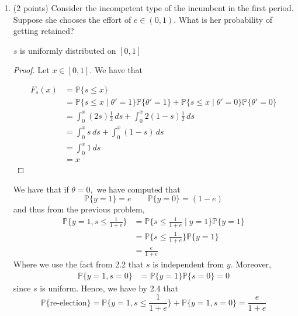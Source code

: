 \documentclass[11pt]{article}
\newcommand{\bbP}{\mathbb{P}}
\begin{document}
\begin{enumerate}
        \item (2 points) Consider the incompetent type of the incumbent in the first period. Suppose she chooses the effort of $e \in (0, 1)$. What is her probability of getting retained?
    \begin{solution}
\begin{lemma}
    $s$ is uniformly distributed on $[0,1]$
\end{lemma}
\begin{proof}
    Let $x \in [0,1].$ We have that

    \begin{align*}
        F_s(x) &= \bbP\{s \leq x\}\\
        &= \bbP\{s \leq x \mid \theta' = 1\}\bbP\{\theta' = 1\} + \bbP\{s \leq x \mid \theta' = 0 \}\bbP\{\theta' = 0\}\\
        &= \int_0^x (2s)\frac{1}{2}\,ds + \int_0^x 2(1-s)\frac{1}{2}\,ds\\
        &= \int_0^x s\,ds + \int_0^x (1-s)\,ds\\
        &= \int_0^x 1 \,ds\\
        &= x
    \end{align*}
\end{proof}

        We have that if $\theta = 0,$ we have computed that
        \[\bbP\{y = 1\} = e\qquad \bbP\{y = 0 \} = (1-e)\] and thus 
        from the previous problem, 
        \begin{align*}
            \bbP\{y= 1, s \leq \frac{1}{1 + e}\} &= \bbP\{s \leq \frac{1}{1 + e} \mid y = 1\}\bbP\{y = 1\}\\
            &= \bbP\{s \leq \frac{1}{1 + e}\}\bbP\{y = 1\}\\
            &= \frac{e}{1 + e}
        \end{align*}
        Where we use the fact from 2.2 that $s$ is independent from $y.$  Moreover, 
        \begin{align*}
            \bbP\{y = 1 , s = 0\} &= \bbP\{y= 1\}\bbP\{s = 0\} =0
        \end{align*}  since $s$ is uniform. Hence, we have by 2.4 that 
        \[\bbP\{\text{re-election}\} = \bbP\{y= 1, s \leq \frac{1}{1 + e}\} + \bbP\{y = 1 , s = 0\} = \boxed{\frac{e}{1  +e} }\]
    \end{solution}


\end{enumerate}
\end{document}
